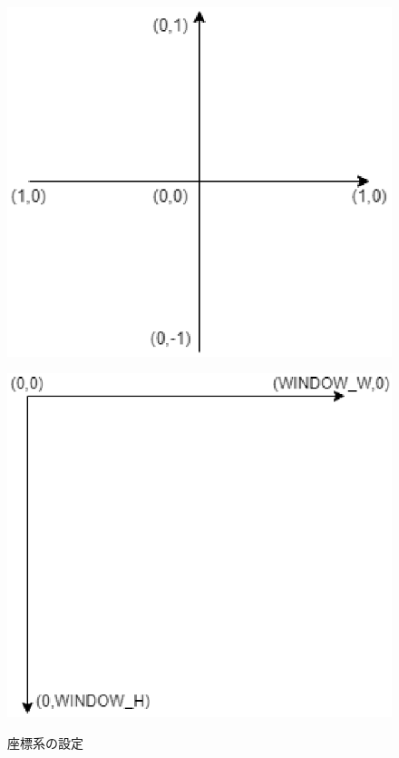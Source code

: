 \documentclass[a4j]{jarticle}
\begin{document}
        \begin{figure}[H]
          \begin{minipage}{0.5\hsize}
           \begin{center}
            \includegraphics[scale=0.6]{czahyou.eps}
           \end{center}
           \label{initzahyou}
          \end{minipage}
          \begin{minipage}{0.5\hsize}
           \begin{center}
            \includegraphics[scale=0.6]{zahyou.eps}
           \end{center}
           \label{generalzahyou}
          \end{minipage}
          \caption{座標系の設定}
          \label{zahyou}
         \end{figure}
\end{document}
